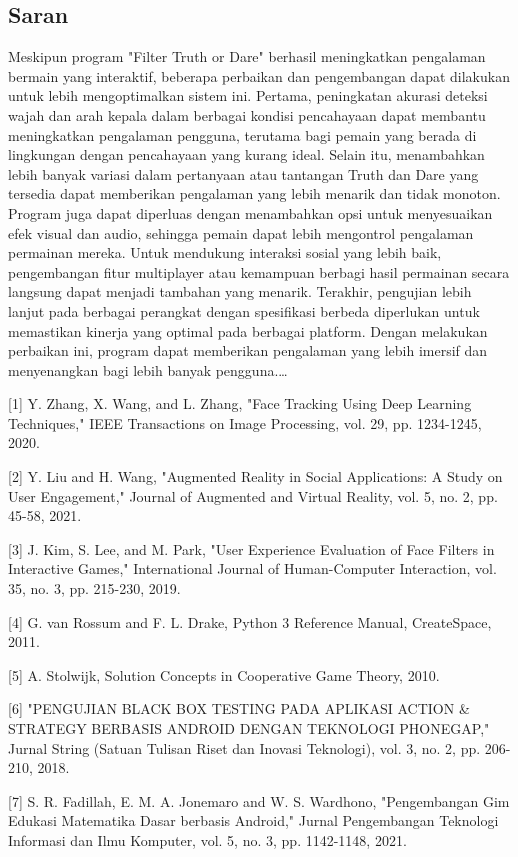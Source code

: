 \documentclass[11pt,a4paper]{article}
\begin{document}
\subsection{Saran}
Meskipun program "Filter Truth or Dare" berhasil meningkatkan pengalaman bermain yang interaktif, beberapa perbaikan dan pengembangan dapat dilakukan untuk lebih mengoptimalkan sistem ini. Pertama, peningkatan akurasi deteksi wajah dan arah kepala dalam berbagai kondisi pencahayaan dapat membantu meningkatkan pengalaman pengguna, terutama bagi pemain yang berada di lingkungan dengan pencahayaan yang kurang ideal. Selain itu, menambahkan lebih banyak variasi dalam pertanyaan atau tantangan Truth dan Dare yang tersedia dapat memberikan pengalaman yang lebih menarik dan tidak monoton. Program juga dapat diperluas dengan menambahkan opsi untuk menyesuaikan efek visual dan audio, sehingga pemain dapat lebih mengontrol pengalaman permainan mereka. Untuk mendukung interaksi sosial yang lebih baik, pengembangan fitur multiplayer atau kemampuan berbagi hasil permainan secara langsung dapat menjadi tambahan yang menarik. Terakhir, pengujian lebih lanjut pada berbagai perangkat dengan spesifikasi berbeda diperlukan untuk memastikan kinerja yang optimal pada berbagai platform. Dengan melakukan perbaikan ini, program dapat memberikan pengalaman yang lebih imersif dan menyenangkan bagi lebih banyak pengguna.\dots

\newpage


[1] 
Y. Zhang, X. Wang, and L. Zhang, "Face Tracking Using Deep Learning Techniques," IEEE Transactions on Image Processing, vol. 29, pp. 1234-1245, 2020.

[2] 
Y. Liu and H. Wang, "Augmented Reality in Social Applications: A Study on User Engagement," Journal of Augmented and Virtual Reality, vol. 5, no. 2, pp. 45-58, 2021.

[3] 
J. Kim, S. Lee, and M. Park, "User Experience Evaluation of Face Filters in Interactive Games," International Journal of Human-Computer Interaction, vol. 35, no. 3, pp. 215-230, 2019.

[4] 
G. van Rossum and F. L. Drake, Python 3 Reference Manual, CreateSpace, 2011.

[5] 
A. Stolwijk, Solution Concepts in Cooperative Game Theory, 2010. 

[6] 
"PENGUJIAN BLACK BOX TESTING PADA APLIKASI ACTION & STRATEGY BERBASIS ANDROID DENGAN TEKNOLOGI PHONEGAP," Jurnal String (Satuan Tulisan Riset dan Inovasi Teknologi), vol. 3, no. 2, pp. 206-210, 2018. 

[7] 
S. R. Fadillah, E. M. A. Jonemaro and W. S. Wardhono, "Pengembangan Gim Edukasi Matematika Dasar berbasis Android," Jurnal Pengembangan Teknologi Informasi dan Ilmu Komputer, vol. 5, no. 3, pp. 1142-1148, 2021. 
\end{document}

